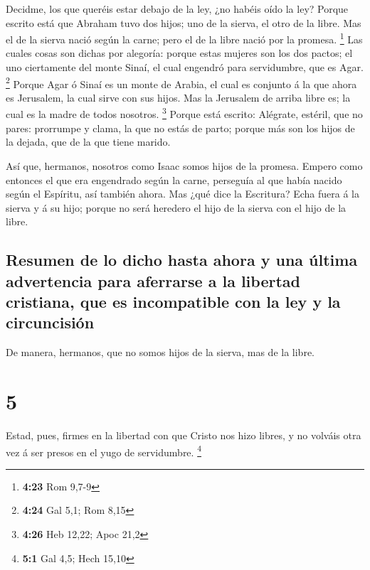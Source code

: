  Decidme, los que queréis estar debajo de la ley, ¿no
habéis oído la ley?  Porque escrito está que Abraham tuvo
dos hijos; uno de la sierva, el otro de la libre.  Mas el
de la sierva nació según la carne; pero el de la libre nació por la
promesa. \footnote{\textbf{4:23} Rom 9,7-9}  Las cuales
cosas son dichas por alegoría: porque estas mujeres son los dos pactos;
el uno ciertamente del monte Sinaí, el cual engendró para servidumbre,
que es Agar. \footnote{\textbf{4:24} Gal 5,1; Rom 8,15} 
Porque Agar ó Sinaí es un monte de Arabia, el cual es conjunto á la que
ahora es Jerusalem, la cual sirve con sus hijos.  Mas la
Jerusalem de arriba libre es; la cual es la madre de todos nosotros.
\footnote{\textbf{4:26} Heb 12,22; Apoc 21,2}  Porque está
escrito: Alégrate, estéril, que no pares: prorrumpe y clama, la que no
estás de parto; porque más son los hijos de la dejada, que de la que
tiene marido.

 Así que, hermanos, nosotros como Isaac somos hijos de la
promesa.  Empero como entonces el que era engendrado según
la carne, perseguía al que había nacido según el Espíritu, así también
ahora.  Mas ¿qué dice la Escritura? Echa fuera á la sierva
y á su hijo; porque no será heredero el hijo de la sierva con el hijo de
la libre.

\hypertarget{resumen-de-lo-dicho-hasta-ahora-y-una-uxfaltima-advertencia-para-aferrarse-a-la-libertad-cristiana-que-es-incompatible-con-la-ley-y-la-circuncisiuxf3n}{%
\subsection{Resumen de lo dicho hasta ahora y una última advertencia
para aferrarse a la libertad cristiana, que es incompatible con la ley y
la
circuncisión}\label{resumen-de-lo-dicho-hasta-ahora-y-una-uxfaltima-advertencia-para-aferrarse-a-la-libertad-cristiana-que-es-incompatible-con-la-ley-y-la-circuncisiuxf3n}}

 De manera, hermanos, que no somos hijos de la sierva, mas
de la libre.

\hypertarget{section-4}{%
\section{5}\label{section-4}}

 Estad, pues, firmes en la libertad con que Cristo nos hizo
libres, y no volváis otra vez á ser presos en el yugo de servidumbre.
\footnote{\textbf{5:1} Gal 4,5; Hech 15,10}

